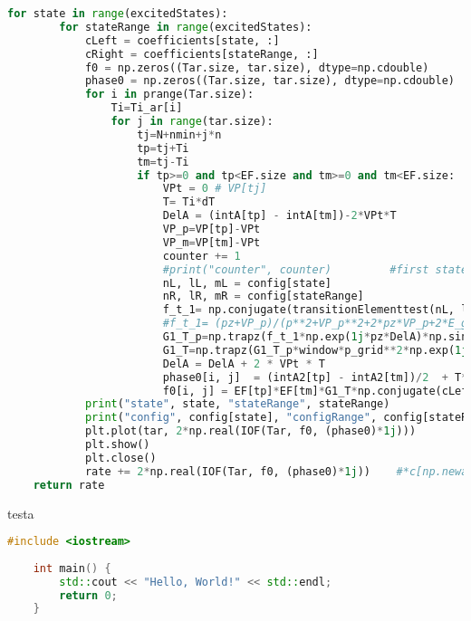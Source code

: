 \begin{lstlisting}[language=Python]
    for state in range(excitedStates):
        for stateRange in range(excitedStates):
            cLeft = coefficients[state, :]
            cRight = coefficients[stateRange, :]
            f0 = np.zeros((Tar.size, tar.size), dtype=np.cdouble)
            phase0 = np.zeros((Tar.size, tar.size), dtype=np.cdouble)
            for i in prange(Tar.size):
                Ti=Ti_ar[i]
                for j in range(tar.size):
                    tj=N+nmin+j*n
                    tp=tj+Ti
                    tm=tj-Ti
                    if tp>=0 and tp<EF.size and tm>=0 and tm<EF.size:
                        VPt = 0 # VP[tj]
                        T= Ti*dT
                        DelA = (intA[tp] - intA[tm])-2*VPt*T
                        VP_p=VP[tp]-VPt
                        VP_m=VP[tm]-VPt
                        counter += 1
                        #print("counter", counter)         #first state and normal SFA are exactly 4pi apart 
                        nL, lL, mL = config[state]
                        nR, lR, mR = config[stateRange]
                        f_t_1= np.conjugate(transitionElementtest(nL, lL, mL, p, pz, VP_m, E_g))*transitionElementtest(nR, lR, mR, p, pz, VP_p, E_g)
                        #f_t_1= (pz+VP_p)/(p**2+VP_p**2+2*pz*VP_p+2*E_g)**3*(pz+VP_m)/(p**2+VP_m**2+2*pz*VP_m+2*E_g)**3
                        G1_T_p=np.trapz(f_t_1*np.exp(1j*pz*DelA)*np.sin(theta), Theta_grid)
                        G1_T=np.trapz(G1_T_p*window*p_grid**2*np.exp(1j*p_grid**2*T), p_grid)
                        DelA = DelA + 2 * VPt * T
                        phase0[i, j]  = (intA2[tp] - intA2[tm])/2  + T*VPt**2-VPt*DelA + eigenEnergy[state]*tm - eigenEnergy[stateRange]*tp 
                        f0[i, j] = EF[tp]*EF[tm]*G1_T*np.conjugate(cLeft[tm])*cRight[tp]#(np.real(c[tp])*np.real(c[tm])+np.imag(c[tp])*np.imag(c[tm]))
            print("state", state, "stateRange", stateRange)
            print("config", config[state], "configRange", config[stateRange])
            plt.plot(tar, 2*np.real(IOF(Tar, f0, (phase0)*1j)))
            plt.show()
            plt.close()
            rate += 2*np.real(IOF(Tar, f0, (phase0)*1j))    #*c[np.newaxis, :]
    return rate
    \end{lstlisting}
    testa
    \begin{lstlisting}[language=C++]
    #include <iostream>
    
    int main() {
        std::cout << "Hello, World!" << std::endl;
        return 0;
    }
\end{lstlisting}
    